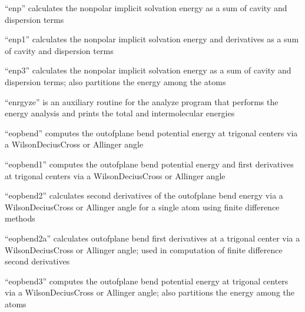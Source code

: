 \documentclass[letterpaper,11pt,english]{sphinxmanual}
\begin{document}
“enp” calculates the nonpolar implicit solvation energy
as a sum of cavity and dispersion terms


“enp1” calculates the nonpolar implicit solvation energy
and derivatives as a sum of cavity and dispersion terms


“enp3” calculates the nonpolar implicit solvation energy as
a sum of cavity and dispersion terms; also partitions the
energy among the atoms


“enrgyze” is an auxiliary routine for the analyze program
that performs the energy analysis and prints the total and
intermolecular energies


“eopbend” computes the out\sphinxhyphen{}of\sphinxhyphen{}plane bend potential energy at
trigonal centers via a Wilson\sphinxhyphen{}Decius\sphinxhyphen{}Cross or Allinger angle


“eopbend1” computes the out\sphinxhyphen{}of\sphinxhyphen{}plane bend potential energy and
first derivatives at trigonal centers via a Wilson\sphinxhyphen{}Decius\sphinxhyphen{}Cross
or Allinger angle


“eopbend2” calculates second derivatives of the out\sphinxhyphen{}of\sphinxhyphen{}plane
bend energy via a Wilson\sphinxhyphen{}Decius\sphinxhyphen{}Cross or Allinger angle for
a single atom using finite difference methods


“eopbend2a” calculates out\sphinxhyphen{}of\sphinxhyphen{}plane bend first derivatives at
a trigonal center via a Wilson\sphinxhyphen{}Decius\sphinxhyphen{}Cross or Allinger angle;
used in computation of finite difference second derivatives


“eopbend3” computes the out\sphinxhyphen{}of\sphinxhyphen{}plane bend potential energy at
trigonal centers via a Wilson\sphinxhyphen{}Decius\sphinxhyphen{}Cross or Allinger angle;
also partitions the energy among the atoms

\end{document}
